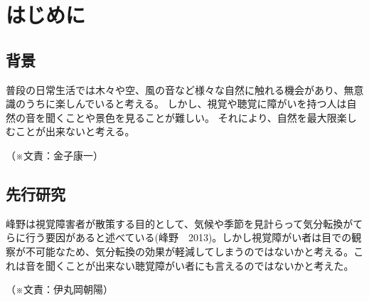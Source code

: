 \documentclass[11pt,a4paper]{report}
\newcommand{\Writer}[1]{
  \normalsize
  \begin{flushright}
    （※文責：#1）
  \end{flushright}
}
\begin{document}
\chapter{はじめに}
\section{背景}
\noindent\space
普段の日常生活では木々や空、風の音など様々な自然に触れる機会があり、無意識のうちに楽しんでいると考える。
しかし、視覚や聴覚に障がいを持つ人は自然の音を聞くことや景色を見ることが難しい。
それにより、自然を最大限楽しむことが出来ないと考える。
\Writer{金子康一}

\section{先行研究}
\noindent\space
峰野は視覚障害者が散策する目的として、気候や季節を見計らって気分転換がてらに行う要因があると述べている(峰野　2013)。しかし視覚障がい者は目での観察が不可能なため、気分転換の効果が軽減してしまうのではないかと考える。これは音を聞くことが出来ない聴覚障がい者にも言えるのではないかと考えた。
\Writer{伊丸岡朝陽}
\end{document}
